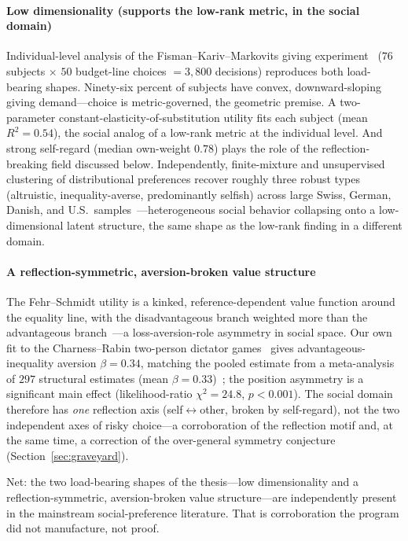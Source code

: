 \documentclass[journal]{IEEEtran}
\begin{document}
\paragraph{Low dimensionality (supports the low-rank metric, in the social domain)}
Individual-level analysis of the Fisman--Kariv--Markovits giving experiment~\cite{fisman2007} ($76$ subjects $\times$ $50$ budget-line choices $=3{,}800$ decisions) reproduces both load-bearing shapes.
Ninety-six percent of subjects have convex, downward-sloping giving demand---choice is metric-governed, the geometric premise.
A two-parameter constant-elasticity-of-substitution utility fits each subject (mean $R^2=0.54$), the social analog of a low-rank metric at the individual level.
And strong self-regard (median own-weight $0.78$) plays the role of the reflection-breaking field discussed below.
Independently, finite-mixture and unsupervised clustering of distributional preferences recover roughly three robust types (altruistic, inequality-averse, predominantly selfish) across large Swiss, German, Danish, and U.S.\ samples~\cite{bruhin2019,fehrCharness2025}---heterogeneous social behavior collapsing onto a low-dimensional latent structure, the same shape as the low-rank finding in a different domain.

\paragraph{A reflection-symmetric, aversion-broken value structure}
The Fehr--Schmidt utility is a kinked, reference-dependent value function around the equality line, with the disadvantageous branch weighted more than the advantageous branch~\cite{fehr1999}---a loss-aversion-role asymmetry in social space.
Our own fit to the Charness--Rabin two-person dictator games~\cite{charness2002} gives advantageous-inequality aversion $\beta=0.34$, matching the pooled estimate from a meta-analysis of $297$ structural estimates (mean $\beta=0.33$)~\cite{nunnariPozzi2022}; the position asymmetry is a significant main effect (likelihood-ratio $\chi^2=24.8$, $p<0.001$).
The social domain therefore has \emph{one} reflection axis (self$\leftrightarrow$other, broken by self-regard), not the two independent axes of risky choice---a corroboration of the reflection motif and, at the same time, a correction of the over-general symmetry conjecture (Section~\ref{sec:graveyard}).

Net: the two load-bearing shapes of the thesis---low dimensionality and a reflection-symmetric, aversion-broken value structure---are independently present in the mainstream social-preference literature.
That is corroboration the program did not manufacture, not proof.
\end{document}

